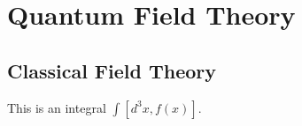 \chapter{Quantum Field Theory \label{chap:QFT}}

\section{Classical Field Theory}

\lipsum

This is an integral $\int[ d^3x, f(x)]$.
